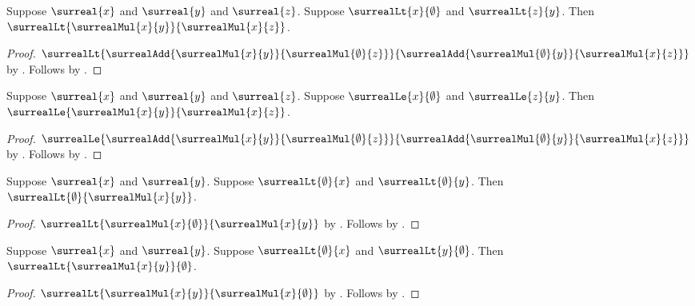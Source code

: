 \begin{theorem}\label{surreal_neg_mul_lt_left}
    Suppose $\surreal{x}$ and $\surreal{y}$ and $\surreal{z}$.
    Suppose $\surrealLt{x}{\emptyset}$ and $\surrealLt{z}{y}$.
    Then $\surrealLt{\surrealMul{x}{y}}{\surrealMul{x}{z}}$.
\end{theorem}
\begin{proof}
    $\surrealLt
        {\surrealAdd{\surrealMul{x}{y}}{\surrealMul{\emptyset}{z}}}
        {\surrealAdd{\surrealMul{\emptyset}{y}}{\surrealMul{x}{z}}}$
        by .
    Follows by
        .
\end{proof}

\begin{theorem}\label{surreal_nonpos_mul_le_left}
    Suppose $\surreal{x}$ and $\surreal{y}$ and $\surreal{z}$.
    Suppose $\surrealLe{x}{\emptyset}$ and $\surrealLe{z}{y}$.
    Then $\surrealLe{\surrealMul{x}{y}}{\surrealMul{x}{z}}$.
\end{theorem}
\begin{proof}
    $\surrealLe
        {\surrealAdd{\surrealMul{x}{y}}{\surrealMul{\emptyset}{z}}}
        {\surrealAdd{\surrealMul{\emptyset}{y}}{\surrealMul{x}{z}}}$
        by .
    Follows by
        .
\end{proof}

\begin{corollary}\label{surreal_mul_pos_pos}
    Suppose $\surreal{x}$ and $\surreal{y}$.
    Suppose $\surrealLt{\emptyset}{x}$ and
        $\surrealLt{\emptyset}{y}$.
    Then $\surrealLt{\emptyset}{\surrealMul{x}{y}}$.
\end{corollary}
\begin{proof}
    $\surrealLt{\surrealMul{x}{\emptyset}}{\surrealMul{x}{y}}$
        by .
    Follows by .
\end{proof}

\begin{corollary}\label{surreal_mul_pos_neg}
    Suppose $\surreal{x}$ and $\surreal{y}$.
    Suppose $\surrealLt{\emptyset}{x}$ and
        $\surrealLt{y}{\emptyset}$.
    Then $\surrealLt{\surrealMul{x}{y}}{\emptyset}$.
\end{corollary}
\begin{proof}
    $\surrealLt{\surrealMul{x}{y}}{\surrealMul{x}{\emptyset}}$
        by .
    Follows by .
\end{proof}

